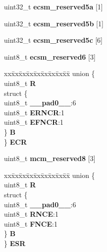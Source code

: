 \begin{DoxyCompactItemize}
\begin{tabbing}
\end{tabbing}\item 
\mbox{\label{structECSM__tag_a3c62066b3a1e00c903133c1e459de0c4}} 
uint32\+\_\+t {\bfseries ecsm\+\_\+reserved5a} \mbox{[}1\mbox{]}
\item 
\mbox{\label{structECSM__tag_a53622bff05f858eb2d2f44decff3ce30}} 
uint32\+\_\+t {\bfseries ecsm\+\_\+reserved5b} \mbox{[}1\mbox{]}
\item 
\mbox{\label{structECSM__tag_a6e36592ffa01f972cb0620f8be067e1c}} 
uint32\+\_\+t {\bfseries ecsm\+\_\+reserved5c} \mbox{[}6\mbox{]}
\item 
\mbox{\label{structECSM__tag_af9f135bfe700cdf8792dd891dd7c4179}} 
uint8\+\_\+t {\bfseries ecsm\+\_\+reserved6} \mbox{[}3\mbox{]}
\item 
\mbox{\label{structECSM__tag_ad30926e57ea3f237138563b3971a04a3}} 
\begin{tabbing}
xx\=xx\=xx\=xx\=xx\=xx\=xx\=xx\=xx\=\kill
union \{\\
\>uint8\_t {\bfseries R}\\
\>struct \{\\
\>\>uint8\_t {\bfseries \_\_pad0\_\_}:6\\
\>\>uint8\_t {\bfseries ERNCR}:1\\
\>\>uint8\_t {\bfseries EFNCR}:1\\
\>\} {\bfseries B}\\
\} {\bfseries ECR}\\

\end{tabbing}\item 
\mbox{\label{structECSM__tag_a2d55c94d85272aa91c7a5e415eccfca4}} 
uint8\+\_\+t {\bfseries mcm\+\_\+reserved8} \mbox{[}3\mbox{]}
\item 
\mbox{\label{structECSM__tag_a18da22a1f4db6a9a6fafa35915c52b88}} 
\begin{tabbing}
xx\=xx\=xx\=xx\=xx\=xx\=xx\=xx\=xx\=\kill
union \{\\
\>uint8\_t {\bfseries R}\\
\>struct \{\\
\>\>uint8\_t {\bfseries \_\_pad0\_\_}:6\\
\>\>uint8\_t {\bfseries RNCE}:1\\
\>\>uint8\_t {\bfseries FNCE}:1\\
\>\} {\bfseries B}\\
\} {\bfseries ESR}\\


\end{tabbing}
\end{DoxyCompactItemize}
